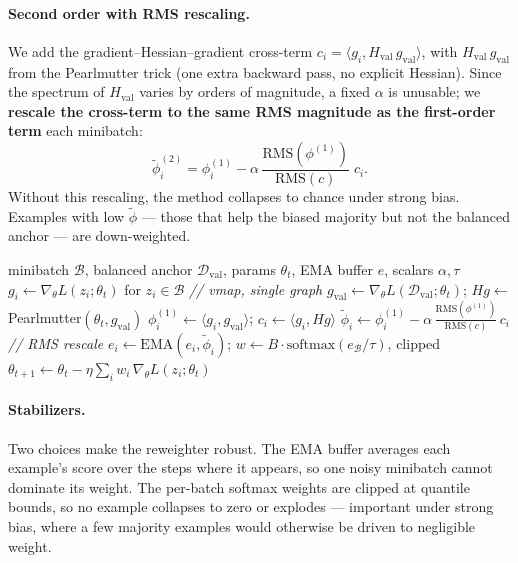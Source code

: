 \documentclass[letterpaper]{article}
\begin{document}
\paragraph{Second order with RMS rescaling.}
We add the gradient--Hessian--gradient cross-term
$c_i=\langle g_i, H_{\mathrm{val}}\,g_{\mathrm{val}}\rangle$, with
$H_{\mathrm{val}}\,g_{\mathrm{val}}$ from the Pearlmutter trick
\citep{pearlmutter1994hvp} (one extra backward pass, no explicit Hessian). Since
the spectrum of $H_{\mathrm{val}}$ varies by orders of magnitude, a fixed
$\alpha$ is unusable; we \textbf{rescale the cross-term to the same RMS magnitude
as the first-order term} each minibatch:
\begin{equation}
\widetilde\phi_i^{(2)} = \phi_i^{(1)} - \alpha\,
\frac{\mathrm{RMS}(\phi^{(1)})}{\mathrm{RMS}(c)}\; c_i .
\label{eq:phi2}
\end{equation}
Without this rescaling, the method collapses to chance under strong bias.
Examples with low $\widetilde\phi$ --- those that help the biased majority but not
the balanced anchor --- are down-weighted.

\begin{algorithm}[t]
\caption{Fairds reweighting step (second order)}
\label{alg:fairds}
\begin{algorithmic}[1]
\REQUIRE minibatch $\mathcal{B}$, balanced anchor $\mathcal{D}_{\mathrm{val}}$,
params $\theta_t$, EMA buffer $e$, scalars $\alpha,\tau$
\STATE $g_i \leftarrow \nabla_\theta L(z_i;\theta_t)$ for $z_i\in\mathcal{B}$
\hfill {\footnotesize\textit{// vmap, single graph}}
\STATE $g_{\mathrm{val}}\leftarrow\nabla_\theta L(\mathcal{D}_{\mathrm{val}};\theta_t)$;\;\;
$Hg\leftarrow$ Pearlmutter$(\theta_t,g_{\mathrm{val}})$
\STATE $\phi^{(1)}_i\leftarrow\langle g_i,g_{\mathrm{val}}\rangle$;\;\;
$c_i\leftarrow\langle g_i,Hg\rangle$
\STATE $\widetilde\phi_i\leftarrow\phi^{(1)}_i-\alpha\,
\frac{\mathrm{RMS}(\phi^{(1)})}{\mathrm{RMS}(c)}\,c_i$
\hfill {\footnotesize\textit{// RMS rescale}}
\STATE $e_i\leftarrow\mathrm{EMA}(e_i,\widetilde\phi_i)$;\;\;
$w\leftarrow B\cdot\mathrm{softmax}(e_{\mathcal{B}}/\tau)$, clipped
\STATE $\theta_{t+1}\leftarrow\theta_t-\eta\sum_{i}w_i\,\nabla_\theta L(z_i;\theta_t)$
\end{algorithmic}
\end{algorithm}

\paragraph{Stabilizers.}
Two choices make the reweighter robust. The EMA buffer averages each example's
score over the steps where it appears, so one noisy minibatch cannot dominate its
weight. The per-batch softmax weights are clipped at quantile bounds, so no
example collapses to zero or explodes --- important under strong bias, where a few
majority examples would otherwise be driven to negligible weight.
\end{document}
